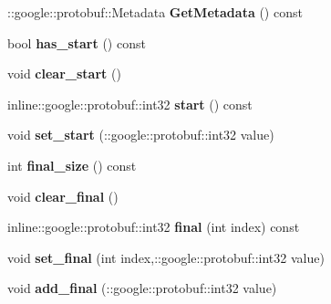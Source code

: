 \begin{DoxyCompactItemize}
\item 
\hypertarget{classlattice_1_1Lattice_aaab0cda217c0772d69348f65cd35c33e}{
::google::protobuf::Metadata {\bfseries GetMetadata} () const }
\label{classlattice_1_1Lattice_aaab0cda217c0772d69348f65cd35c33e}

\item 
\hypertarget{classlattice_1_1Lattice_a3a06d03c8fc2d4810946301eb851d9bd}{
bool {\bfseries has\_\-start} () const }
\label{classlattice_1_1Lattice_a3a06d03c8fc2d4810946301eb851d9bd}

\item 
\hypertarget{classlattice_1_1Lattice_a8a22bdebf8702ccd1d7221acdd9447f9}{
void {\bfseries clear\_\-start} ()}
\label{classlattice_1_1Lattice_a8a22bdebf8702ccd1d7221acdd9447f9}

\item 
\hypertarget{classlattice_1_1Lattice_aa736b2c11a852db4859bb421de1b9d5b}{
inline::google::protobuf::int32 {\bfseries start} () const }
\label{classlattice_1_1Lattice_aa736b2c11a852db4859bb421de1b9d5b}

\item 
\hypertarget{classlattice_1_1Lattice_aeff8a9022b4341221a2fb81c0da4958c}{
void {\bfseries set\_\-start} (::google::protobuf::int32 value)}
\label{classlattice_1_1Lattice_aeff8a9022b4341221a2fb81c0da4958c}

\item 
\hypertarget{classlattice_1_1Lattice_acce3e8812b8edc5fee61a1c07144e35c}{
int {\bfseries final\_\-size} () const }
\label{classlattice_1_1Lattice_acce3e8812b8edc5fee61a1c07144e35c}

\item 
\hypertarget{classlattice_1_1Lattice_a796495494bd3460afe3a3da75d9a9866}{
void {\bfseries clear\_\-final} ()}
\label{classlattice_1_1Lattice_a796495494bd3460afe3a3da75d9a9866}

\item 
\hypertarget{classlattice_1_1Lattice_a047eb8b2fdf3ba5b0f34b175084d4957}{
inline::google::protobuf::int32 {\bfseries final} (int index) const }
\label{classlattice_1_1Lattice_a047eb8b2fdf3ba5b0f34b175084d4957}

\item 
\hypertarget{classlattice_1_1Lattice_afd8033a01d6390099a2a25033e38302f}{
void {\bfseries set\_\-final} (int index,::google::protobuf::int32 value)}
\label{classlattice_1_1Lattice_afd8033a01d6390099a2a25033e38302f}

\item 
\hypertarget{classlattice_1_1Lattice_a8b9c4979ec846fb10419fd0a776e2bf6}{
void {\bfseries add\_\-final} (::google::protobuf::int32 value)}
\label{classlattice_1_1Lattice_a8b9c4979ec846fb10419fd0a776e2bf6}


\end{DoxyCompactItemize}
